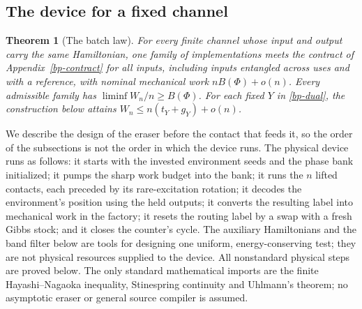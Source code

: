 \documentclass[11pt]{article}
\newtheorem{theorem}{Theorem}
\theoremstyle{definition}
\theoremstyle{remark}
\begin{document}
\subsection{The device for a fixed channel}
\begin{theorem}[The batch law]\label{bp-batch}
For every finite channel whose input and output carry the same Hamiltonian, one family of
implementations meets the contract of Appendix~\ref{bp-contract} for all inputs, including inputs
entangled across uses and with a reference, with nominal mechanical work $nB(\Phi)+o(n)$. Every admissible family has $\liminf W_n/n\ge B(\Phi)$.
For each fixed $Y$ in \eqref{bp-dual}, the construction below attains
$W_n\le n(t_Y+g_Y)+o(n)$.
\end{theorem}
We describe the design of the eraser before the contact that feeds it, so the order of the subsections is not the order in which the device runs. The physical device runs as follows: it starts with the invested environment seeds and the phase bank initialized; it pumps the sharp work budget into the bank; it runs the $n$ lifted contacts, each preceded by its rare-excitation rotation; it decodes the environment's position using the held outputs; it converts the resulting label into mechanical work in the factory; it resets the routing label by a swap with a fresh Gibbs stock; and it closes the counter's cycle. The auxiliary Hamiltonians and the band filter below are tools for designing one uniform, energy-conserving test; they are not physical resources supplied to the device. All nonstandard physical steps are proved below. The only standard
mathematical imports are the finite Hayashi--Nagaoka inequality,
Stinespring continuity and Uhlmann's theorem; no asymptotic eraser
or general source compiler is assumed.
\end{document}
